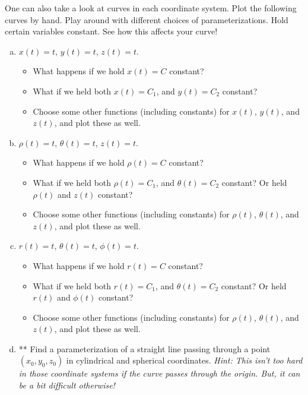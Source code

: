 \documentclass[12pt]{article} %
\begin{document}
\begin{problem}
One can also take a look at curves in each coordinate system.  Plot the following curves by hand. Play around with different choices of parameterizations. Hold certain variables constant. See how this affects your curve!
\begin{enumerate}[(a)]
    \item $x(t)=t$, $y(t)=t$, $z(t)=t$.
    \begin{itemize}
        \item What happens if we hold $x(t)=C$ constant? 
        \item What if we held both $x(t)=C_1$, and $y(t)=C_2$ constant?
        \item Choose some other functions (including constants) for $x(t)$, $y(t)$, and $z(t)$, and plot these as well.
    \end{itemize}
    \item $\rho(t)=t$, $\theta(t)=t$, $z(t)=t$.
    \begin{itemize}
        \item What happens if we hold $\rho(t)=C$ constant? 
        \item What if we held both $\rho(t)=C_1$, and $\theta(t)=C_2$ constant? Or held $\rho(t)$ and $z(t)$ constant?
        \item Choose some other functions (including constants) for $\rho(t)$, $\theta(t)$, and $z(t)$, and plot these as well.
    \end{itemize}
    \item $r(t)=t$, $\theta(t)=t$, $\phi(t)=t$.
    \begin{itemize}
        \item What happens if we hold $r(t)=C$ constant? 
        \item What if we held both $r(t)=C_1$, and $\theta(t)=C_2$ constant? Or held $r(t)$ and $\phi(t)$ constant?
        \item Choose some other functions (including constants) for $\rho(t)$, $\theta(t)$, and $z(t)$, and plot these as well.
    \end{itemize}
    \item ** Find a parameterization of a straight line passing through a point $(x_0,y_0,z_0)$ in cylindrical and spherical coordinates. \emph{Hint: This isn't too hard in those coordinate systems if the curve passes through the origin. But, it can be a bit difficult otherwise!}
\end{enumerate}
\end{problem}
\end{document}
